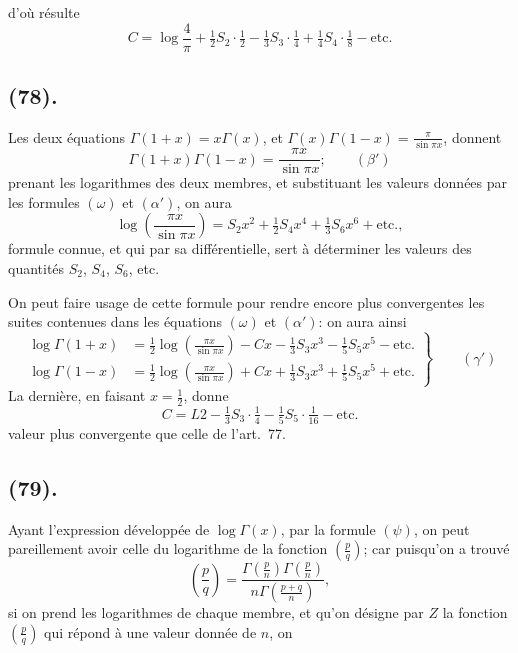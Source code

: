 \documentclass{article}
\begin{document}
d'où résulte
\[ C=\log\frac{4}{\pi}+\tfrac{1}{2}S_{2}\cdot\tfrac{1}{2}-\tfrac{1}{3}S_{3}\cdot\tfrac{1}{4}+\tfrac{1}{4}S_{4}\cdot\tfrac{1}{8}-\text{etc.} \]

\subsection*{(78).}

Les deux équations $\Gamma(1+x)=x\Gamma(x)$, et $\Gamma(x)\Gamma(1-x)=\frac{\pi}{\sin\pi x}$, donnent
\[ \Gamma(1+x)\Gamma(1-x)=\frac{\pi x}{\sin\pi x};\qquad(\beta') \]
prenant les logarithmes des deux membres, et substituant les valeurs données par les formules $(\omega)$ et $(\alpha')$, on aura
\[ \log\left(\frac{\pi x}{\sin\pi x}\right)=S_{2}x^{2}+\tfrac{1}{2}S_{4}x^{4}+\tfrac{1}{3}S_{6}x^{6}+\text{etc.}, \]
formule connue, et qui par sa différentielle, sert à déterminer les valeurs des quantités $S_{2}$, $S_{4}$, $S_{6}$, etc.

On peut faire usage de cette formule pour rendre encore plus convergentes les suites contenues dans les équations $(\omega)$ et $(\alpha')$: on aura ainsi
\[ \left.\begin{aligned} \log\Gamma(1+x)&=\tfrac{1}{2}\log\left(\frac{\pi x}{\sin\pi x}\right)-Cx-\tfrac{1}{3}S_{3}x^{3}-\tfrac{1}{5}S_{5}x^{5}-\text{etc.}\\ \log\Gamma(1-x)&=\tfrac{1}{2}\log\left(\frac{\pi x}{\sin\pi x}\right)+Cx+\tfrac{1}{3}S_{3}x^{3}+\tfrac{1}{5}S_{5}x^{5}+\text{etc.} \end{aligned}\right\}\qquad(\gamma') \]
La dernière, en faisant $x=\frac{1}{2}$, donne
\[ C=L2-\tfrac{1}{3}S_{3}\cdot\tfrac{1}{4}-\tfrac{1}{5}S_{5}\cdot\tfrac{1}{16}-\text{etc.} \]
valeur plus convergente que celle de l'art.\ 77.

\subsection*{(79).}

Ayant l'expression développée de $\log\Gamma(x)$, par la formule $(\psi)$, on peut pareillement avoir celle du logarithme de la fonction $\left(\frac{p}{q}\right)$; car puisqu'on a trouvé
\[ \left(\frac{p}{q}\right)=\frac{\Gamma\left(\frac{p}{n}\right)\Gamma\left(\frac{p}{n}\right)}{n\Gamma\left(\frac{p+q}{n}\right)}, \]
si on prend les logarithmes de chaque membre, et qu'on désigne par $Z$ la fonction $\left(\frac{p}{q}\right)$ qui répond à une valeur donnée de $n$, on
\end{document}
